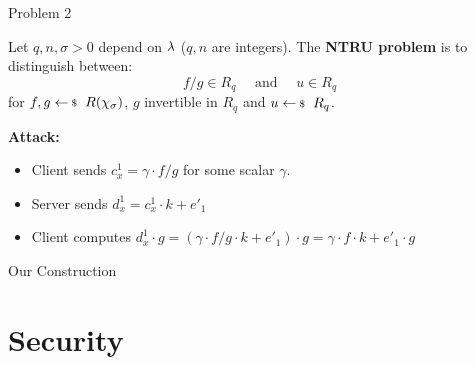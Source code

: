 \documentclass[xcolor=table,10pt,aspectratio=169]{beamer}
\begin{document}
\begin{frame}[label={sec:org579df9b}]{Problem 2}
\begin{definition}
  Let \(q,n,\sigma > 0\) depend on \(\lambda\) (\(q,n\) are integers). The \textbf{NTRU problem} is to distinguish between:
  \[f/g \in R_q \quad \text{ and }\quad u \in R_q\]
  for \(f,g \sample R(\chi_\sigma)\), \(g\) invertible in \(R_q\) and \(u \sample R_q\).
\end{definition}

\textbf{Attack:}

\begin{itemize}
\item Client sends \(c_x^1 = \gamma\cdot f/g\) for some scalar \(\gamma\).
\item Server sends \(d_x^1  = c_x^1 \cdot k + e'_1\)
\item Client computes \(d_x^1\cdot g = (\gamma\cdot f/g \cdot k + e'_1) \cdot g = \gamma\cdot f\cdot k +  e'_1 \cdot g\)
\end{itemize}
\end{frame}

\begin{frame}[label={sec:orgdbe1364}]{Our Construction}
\begin{center}
\end{center}
\end{frame}

\section{Security}
\label{sec:org064770c}
\end{document}
